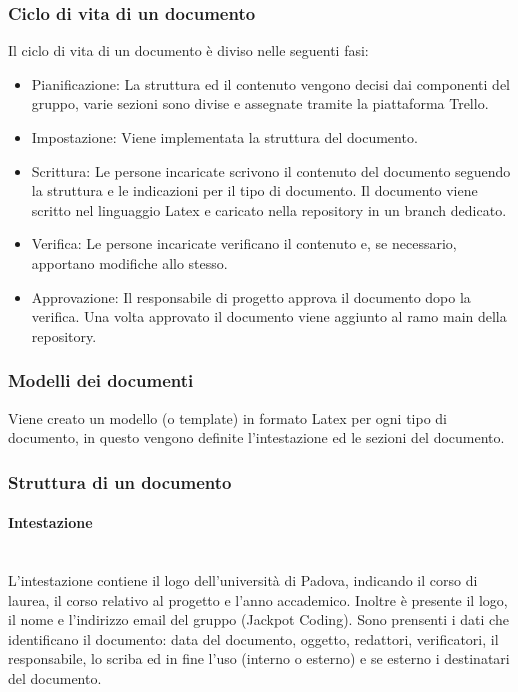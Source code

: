 \documentclass{article}
\begin{document}
\subsubsection{Ciclo di vita di un documento}
Il ciclo di vita di un documento è diviso nelle seguenti fasi:
\begin{itemize}
    \item Pianificazione: La struttura ed il contenuto vengono decisi dai componenti del gruppo, varie sezioni sono divise e assegnate tramite la piattaforma Trello.
    \item Impostazione: Viene implementata la struttura del documento.
    \item Scrittura: Le persone incaricate scrivono il contenuto del documento seguendo la struttura e le indicazioni per il tipo di documento. Il documento viene scritto nel linguaggio Latex e caricato nella repository in un branch dedicato.
    \item Verifica: Le persone incaricate verificano il contenuto e, se necessario, apportano modifiche allo stesso.
    \item Approvazione: Il responsabile di progetto approva il documento dopo la verifica. Una volta approvato il documento viene aggiunto al ramo main della repository.
\end{itemize}

\subsubsection{Modelli dei documenti}
Viene creato un modello (o template) in formato Latex per ogni tipo di documento, in questo vengono definite l'intestazione ed le sezioni del documento.

\subsubsection{Struttura di un documento}

\paragraph{Intestazione}~\\
L'intestazione contiene il logo dell'università di Padova, indicando il corso di laurea, il corso relativo al progetto e l'anno accademico. Inoltre è presente il logo, il nome e l'indirizzo email del gruppo (Jackpot Coding).
Sono prensenti i dati che identificano il documento: data del documento, oggetto, redattori, verificatori, il responsabile, lo scriba ed in fine l'uso (interno o esterno) e se esterno i destinatari del documento.
\end{document}
